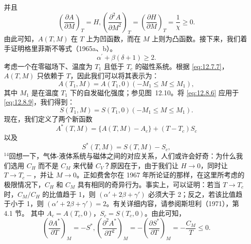 并且
\begin{equation}\tag{12.8.7}\label{eq:12.8.7}
\left( \frac { \partial A } { \partial M } \right) _ { T } = H ,  \left( \frac { \partial ^{2} A } { \partial M ^{2} } \right) _ { T } = \left( \frac { \partial H } { \partial M } \right) _ { T } = \frac { 1 } { \chi } \geq 0 .
\end{equation}
由此可知，\(A(T,M)\) 在 \(T\) 上为凹函数，而在 \(M\) 上则为凸函数。接下来，我们着手证明格里菲斯不等式（1965a、b）。
\begin{equation}\tag{12.8.8}\label{eq:12.8.8}
\alpha ^{\prime} + \beta ( \delta + 1 ) \geq 2 .
\end{equation}
考虑一个在零磁场下、温度为 \(T_{1}\) 且低于 \(T_{c}\) 的磁性系统。根据 \autoref{eq:12.7.7}，\(A(T, M)\) 只依赖于 \(T\)，因此我们可以将其表示为：
\begin{equation}\tag{12.8.9}\label{eq:12.8.9}
A ( T _ { 1 } , M ) = A ( T _ { 1 } , 0 )  ( - M _ { 1 } \leq M \leq M _ { 1 } ) ,
\end{equation}
其中 \(M_{1}\) 是在温度 \(T_{1}\) 下的自发磁化强度；参见图~12.10。将 \autoref{eq:12.8.6} 应用于 \autoref{eq:12.8.9}，我们得到：
\begin{equation}\tag{12.8.10}\label{eq:12.8.10}
S ( T _ { 1 } , M ) = S ( T _ { 1 } , 0 )  ( - M _ { 1 } \leq M \leq M _ { 1 } ) .
\end{equation}
现在，我们定义了两个新函数
\begin{equation}\tag{12.8.11}\label{eq:12.8.11}
A ^{*} ( T , M ) = \{ A ( T , M ) - A _ { c } \} + ( T - T _ { c } ) S _ { c }
\end{equation}
以及
\begin{equation}\tag{12.8.12}\label{eq:12.8.12}
S ^{*} ( T , M ) = S ( T , M ) - S _ { c } ,
\end{equation}
\(^{14}\)回想一下，气体-液体系统与磁体之间的对应关系，人们或许会好奇：为什么我们选用 \(C_{H}\) 而不是 \(C_{M}\) 来代替 \(C_{V}\)？原因在于，由于我们让 \(H \rightarrow 0\)，同时让 \(T \rightarrow T_{c}-\)，并让 \(M \rightarrow 0\)。正如费舍尔在 1967 年所论证的那样，在这里所考虑的极限情况下，\(C_{H}\) 和 \(C_{M}\) 具有相同的奇异行为。事实上，可以证明：若当 \(T \rightarrow T_{c}\) 时，\(C_{M}/C_{H}\) 的比值趋于 1，则 \((\alpha' + 2\beta + \gamma')\) 必须大于 2；反之，若该比值趋于小于 1，则 \((\alpha' + 2\beta + \gamma') = 2\)。有关详细内容，请参阅斯坦利（1971），第 4.1 节。
其中 \(A_{c} = A(T_{c},0)\)，\(S_{c} = S(T_{c},0)\)。由此可知，
\begin{equation}\tag{12.8.13}\label{eq:12.8.13}
\left( \frac { \partial A ^{*} } { \partial T } \right) _ { M } = - S ^{*} ,  \left( \frac { \partial ^{2} A ^{*} } { \partial T ^{2} } \right) _ { M } = - \left( \frac { \partial S ^{*} } { \partial T } \right) _ { M } = - \frac { C _ { M } } { T } \leq 0 .
\end{equation}
